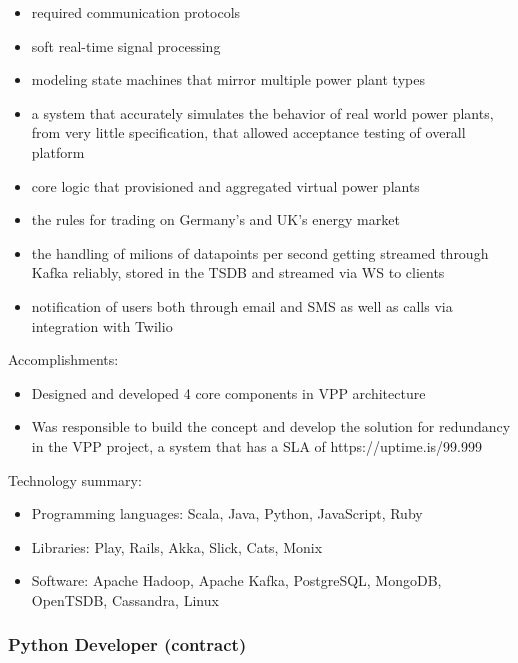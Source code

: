 \documentclass[
]{rss}
\providecommand{\tightlist}{%
  \setlength{\itemsep}{0pt}\setlength{\parskip}{0pt}}
\begin{document}
\begin{resume}
\begin{itemize}
\tightlist
\item
  required communication protocols
\item
  soft real-time signal processing
\item
  modeling state machines that mirror multiple power plant types
\item
  a system that accurately simulates the behavior of real world power
  plants, from very little specification, that allowed acceptance
  testing of overall platform
\item
  core logic that provisioned and aggregated virtual power plants
\item
  the rules for trading on Germany's and UK's energy market
\item
  the handling of milions of datapoints per second getting streamed
  through Kafka reliably, stored in the TSDB and streamed via WS to
  clients
\item
  notification of users both through email and SMS as well as calls via
  integration with Twilio
\end{itemize}

Accomplishments:

\begin{itemize}
\tightlist
\item
  Designed and developed 4 core components in VPP architecture
\item
  Was responsible to build the concept and develop the solution for
  redundancy in the VPP project, a system that has a SLA of
  https://uptime.is/99.999
\end{itemize}

Technology summary:

\begin{itemize}
\tightlist
\item
  Programming languages: Scala, Java, Python, JavaScript, Ruby
\item
  Libraries: Play, Rails, Akka, Slick, Cats, Monix
\item
  Software: Apache Hadoop, Apache Kafka, PostgreSQL, MongoDB, OpenTSDB,
  Cassandra, Linux
\end{itemize}

\hypertarget{python-developer-contract}{%
\subsubsection{Python Developer
(contract)}\label{python-developer-contract}}


\end{resume}
\end{document}
